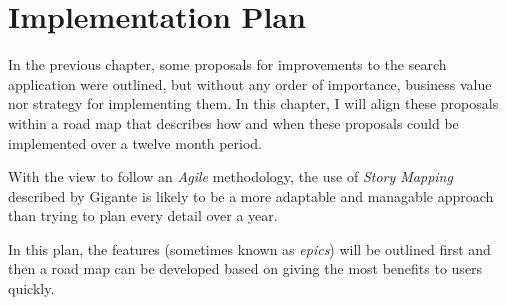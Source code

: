 \chapter{Implementation Plan}

In the previous chapter, some proposals for improvements to
the search application were outlined, but without any order
of importance, business value nor strategy for implementing them.
In this chapter, I will align these proposals within a road map
that describes how and when these proposals could be implemented
over a twelve month period.

With the view to follow an \emph{Agile} methodology, the use
of \emph{Story Mapping} described by Gigante\cite{gigante2013creating}
is likely to be a more adaptable and managable approach than
trying to plan every detail over a year.

In this plan, the features (sometimes known as \emph{epics}) will
be outlined first and then a road map can be developed based
on giving the most benefits to users quickly.




